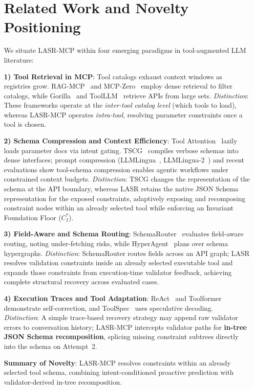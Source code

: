 \section{Related Work and Novelty Positioning}
\label{sec:related_work}

We situate LASR-MCP within four emerging paradigms in tool-augmented LLM literature:

\noindent\textbf{1) Tool Retrieval in MCP}: Tool catalogs exhaust context windows as registries grow. RAG-MCP~\cite{rag_mcp2024} and MCP-Zero~\cite{mcp_zero2024} employ dense retrieval to filter catalogs, while Gorilla~\cite{patil2023gorilla} and ToolLLM~\cite{qin2023toolllm} retrieve APIs from large sets. \textit{Distinction}: These frameworks operate at the \textit{inter-tool catalog level} (which tools to load), whereas LASR-MCP operates \textit{intra-tool}, resolving parameter constraints once a tool is chosen.

\noindent\textbf{2) Schema Compression and Context Efficiency}: Tool Attention~\cite{tool_attention2024} lazily loads parameter docs via intent gating. TSCG~\cite{tscg2024} compiles verbose schemas into dense interfaces; prompt compression (LLMLingua~\cite{jiang2023llmlingua}, LLMLingua-2~\cite{pan2024llmlingua2}) and recent evaluations show tool-schema compression enables agentic workflows under constrained context budgets. \textit{Distinction}: TSCG changes the representation of the schema at the API boundary, whereas LASR retains the native JSON Schema representation for the exposed constraints, adaptively exposing and recomposing constraint nodes within an already selected tool while enforcing an Invariant Foundation Floor ($C_I^*$).

\noindent\textbf{3) Field-Aware and Schema Routing}: SchemaRouter~\cite{schemarouter2024} evaluates field-aware routing, noting under-fetching risks, while HyperAgent~\cite{hyperagent2024} plans over schema hypergraphs. \textit{Distinction}: SchemaRouter routes fields across an API graph; LASR resolves validation constraints inside an already selected executable tool and expands those constraints from execution-time validator feedback, achieving complete structural recovery across evaluated cases.

\noindent\textbf{4) Execution Traces and Tool Adaptation}: ReAct~\cite{yao2022react} and Toolformer~\cite{schick2024toolformer} demonstrate self-correction, and ToolSpec~\cite{toolspec2024} uses speculative decoding. \textit{Distinction}: A simple trace-based recovery strategy may append raw validator errors to conversation history; LASR-MCP intercepts validator paths for \textbf{in-tree JSON Schema recomposition}, splicing missing constraint subtrees directly into the schema on Attempt~2.

\noindent\textbf{Summary of Novelty}: LASR-MCP resolves constraints within an already selected tool schema, combining intent-conditioned proactive prediction with validator-derived in-tree recomposition.

